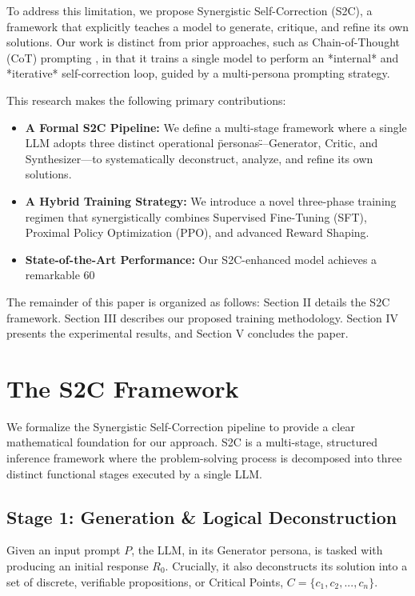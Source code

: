 \documentclass[conference]{IEEEtran}
\begin{document}
To address this limitation, we propose Synergistic Self-Correction (S2C), a framework that explicitly teaches a model to generate, critique, and refine its own solutions. Our work is distinct from prior approaches, such as Chain-of-Thought (CoT) prompting \cite{b1}, in that it trains a single model to perform an *internal* and *iterative* self-correction loop, guided by a multi-persona prompting strategy.

This research makes the following primary contributions:
\begin{itemize}
    \item \textbf{A Formal S2C Pipeline:} We define a multi-stage framework where a single LLM adopts three distinct operational \"personas\"---Generator, Critic, and Synthesizer---to systematically deconstruct, analyze, and refine its own solutions.
    \item \textbf{A Hybrid Training Strategy:} We introduce a novel three-phase training regimen that synergistically combines Supervised Fine-Tuning (SFT), Proximal Policy Optimization (PPO), and advanced Reward Shaping.
    \item \textbf{State-of-the-Art Performance:} Our S2C-enhanced model achieves a remarkable 60%
\end{itemize}

The remainder of this paper is organized as follows: Section II details the S2C framework. Section III describes our proposed training methodology. Section IV presents the experimental results, and Section V concludes the paper.

\section{The S2C Framework}
We formalize the Synergistic Self-Correction pipeline to provide a clear mathematical foundation for our approach. S2C is a multi-stage, structured inference framework where the problem-solving process is decomposed into three distinct functional stages executed by a single LLM.

\subsection{Stage 1: Generation \& Logical Deconstruction}
Given an input prompt $P$, the LLM, in its Generator persona, is tasked with producing an initial response $R_0$. Crucially, it also deconstructs its solution into a set of discrete, verifiable propositions, or Critical Points, $C = \{c_1, c_2, ..., c_n\}$.
\end{document}
